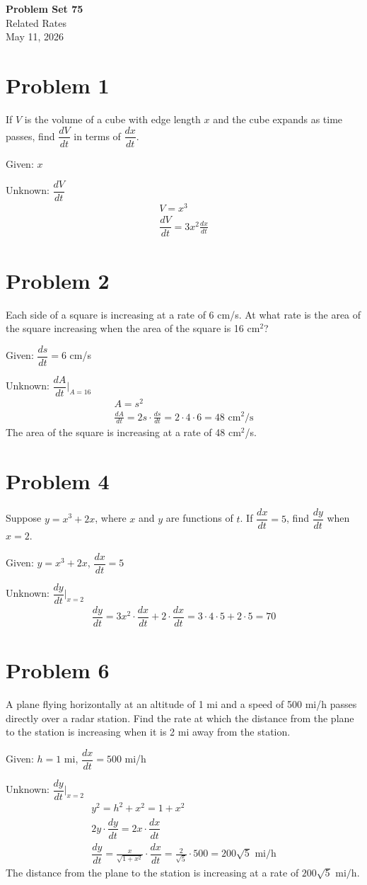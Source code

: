 \documentclass[12pt]{article}
\newcommand{\dydt}{\dfrac{dy}{dt}}
\newcommand{\dxdt}{\dfrac{dx}{dt}}
\newcommand{\vem}{\vspace{0.5em}}
\newcommand{\problem}[1]{\section{Problem #1}}
\begin{document}
\vspace*{0cm}

\begin{center}
    {\Large \bfseries Problem Set 75} \\[0.5cm]
    {\large Related Rates} \\[0.35cm]
    {\normalsize May 11, 2026}
\end{center}


\problem{1}
If $V$ is the volume of a cube with edge length $x$ and the cube expands as time passes, find $\dfrac{dV}{dt}$ in terms of $\dfrac{dx}{dt}$. \vem

Given: $x $

Unknown: $\dfrac{dV}{dt}$
\begin{gather*}
    V=x^3\\
    \dfrac{dV}{dt}=\boxed{3x^2\frac{dx}{dt}}
\end{gather*}

\problem{2}
Each side of a square is increasing at a rate of 6 cm/s. At what rate is the area of the square increasing when the area of the square is 16 cm$^2$? \vem

Given: $\dfrac{ds}{dt}=6$ cm/s \vem

Unknown: $\dfrac{dA}{dt} \Big|_{A=16}$
\begin{gather*}
    A=s^2\\
    \frac{dA}{dt}=2s\cdot \frac{ds}{dt}=2\cdot 4\cdot 6=\boxed{48\text{ cm$^2$/s}}
\end{gather*}
The area of the square is increasing at a rate of 48 cm$^2$/s.

\problem{4}
Suppose $y=x^3+2x$, where $x$ and $y$ are functions of $t$. If $\dfrac{dx}{dt}=5$, find $\dfrac{dy}{dt}$ when $x=2$. \vem

Given: $y=x^3+2x$, $\dfrac{dx}{dt}=5$ \vem

Unknown: $\dfrac{dy}{dt} \Big|_{x=2}$
\begin{gather*}
    \dydt=3x^2\cdot \dxdt+2\cdot \dxdt=3\cdot 4\cdot 5+2\cdot 5=\boxed{70}
\end{gather*}

\problem{6}
A plane flying horizontally at an altitude of 1 mi and a speed of 500 mi/h passes directly over a radar station. Find the rate at which the distance from the plane to the station is increasing when it is 2 mi away from the station. \vem

Given: $h=1$ mi, $\dxdt=500$ mi/h\vem

Unknown: $\dydt \Big|_{x= 2}$
\begin{gather*}
    y^2=h^2+x^2=1+x^2\\
    2y\cdot \dydt=2x\cdot \dxdt\\
    \dydt=\frac{x}{\sqrt{1+x^2}}\cdot  \dxdt=\frac{2}{\sqrt{5}}\cdot 500=\boxed{200\sqrt{5} \text{ mi/h}}
\end{gather*}
The distance from the plane to the station is increasing at a rate of $200\sqrt{5} \text{ mi/h}$.
\end{document}
